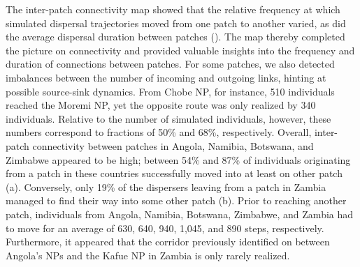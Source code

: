 \documentclass[../FinalThesis.tex]{subfiles}
\begin{document}
The inter-patch connectivity map showed that the relative frequency at which
simulated dispersal trajectories moved from one patch to another varied, as did
the average dispersal duration between patches ().
The map thereby completed the picture on connectivity and provided valuable
insights into the frequency and duration of connections between patches. For
some patches, we also detected imbalances between the number of incoming and
outgoing links, hinting at possible source-sink dynamics. From Chobe NP, for
instance, 510 individuals reached the Moremi NP, yet the opposite route was only
realized by 340 individuals. Relative to the number of simulated individuals,
however, these numbers correspond to fractions of 50\% and 68\%, respectively.
Overall, inter-patch connectivity between patches in Angola, Namibia, Botswana,
and Zimbabwe appeared to be high; between 54\% and 87\% of individuals
originating from a patch in these countries successfully moved into at least on
other patch (a). Conversely, only 19\% of the dispersers
leaving from a patch in Zambia managed to find their way into some other patch
(b). Prior to reaching another patch, individuals from
Angola, Namibia, Botswana, Zimbabwe, and Zambia had to move for an average of
630, 640, 940, 1,045, and 890 steps, respectively. Furthermore, it appeared that
the corridor previously identified on  between
Angola's NPs and the Kafue NP in Zambia is only rarely realized.
\end{document}
